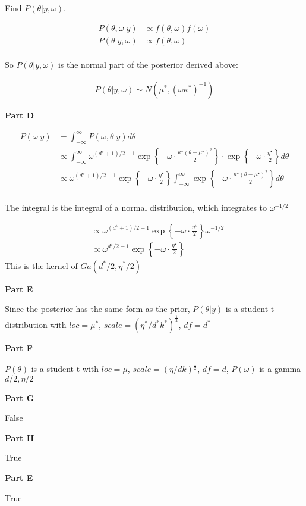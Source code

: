 \documentclass[12pt]{amsart}
\begin{document}
Find $P(\theta|y, \omega)$. 


\begin{align*}
    P(\theta, \omega|y) & \propto f(\theta, \omega)f(\omega)\\
  P(\theta|y, \omega)   & \propto f(\theta, \omega)
\end{align*}\\

So $P(\theta|y, \omega)$ is the normal part of the posterior derived above:

\begin{align*}
    P(\theta|y, \omega) \sim N(\mu^*, (\omega \kappa^*)^{-1})
\end{align*}

\bigskip

{\bf Part D} 
\bigskip

\begin{align*}
    P(\omega|y) &= \int_{-\infty}^{\infty}P(\omega, \theta|y)d\theta\\
    &\propto \int_{-\infty}^{\infty}\omega^{(d^\star+1)/2 - 1} \exp \left\{ - \omega \cdot \frac{\kappa^\star (\theta - \mu^\star)^2}{2}  \right\}
\cdot \exp\left\{ -  \omega \cdot \frac{\eta^\star}{2}  \right\}d\theta \\
&\propto \omega^{(d^\star+1)/2 - 1} \exp\left\{ -  \omega \cdot \frac{\eta^\star}{2}  \right\} \int_{-\infty}^{\infty} \exp \left\{ - \omega \cdot \frac{\kappa^\star (\theta - \mu^\star)^2}{2}  \right\}d\theta\\
\end{align*}

The integral is the integral of a normal distribution, which integrates to $\omega^{-1/2}$

\begin{align*}
    & \propto \omega^{(d^\star+1)/2 - 1} \exp\left\{ -  \omega \cdot \frac{\eta^\star}{2}  \right\} \omega^{-1/2} \\
     & \propto \omega^{d^\star/2- 1} \exp\left\{ -  \omega \cdot \frac{\eta^\star}{2}  \right\}
\end{align*}
This is the kernel of $Ga(d^*/2, \eta^*/2)$

\bigskip
\bigskip
{\bf Part E} 
\bigskip

Since the posterior has the same form as the prior, $P(\theta|y)$ is a student t distribution with $loc=\mu^*$, $scale=(\eta^*/d^*k^*)^\frac{1}{2}$, $df=d^*$

\bigskip
\bigskip
{\bf Part F} 
\bigskip

$P(\theta)$ is a  student t with $loc=\mu$, $scale=(\eta/dk)^\frac{1}{2}$, $df=d$, $P(\omega)$ is a gamma $d/2,\eta/2$

\bigskip
\bigskip
{\bf Part G} 

\bigskip
False
\bigskip
\bigskip

{\bf Part H} 

\bigskip
True
\bigskip
\bigskip

{\bf Part E} 

\bigskip
True
\end{document}
